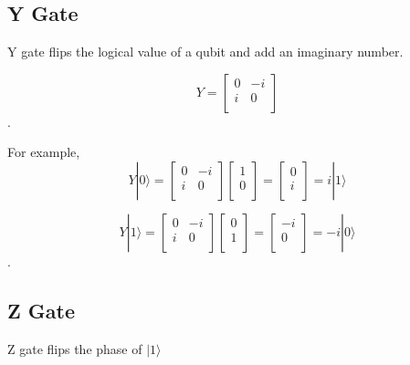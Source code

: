 \subsection{Y Gate}

Y gate flips the logical value of a qubit and add an imaginary number.

\begin{equation}
 Y = \begin{bmatrix}
0 & -i \\
i & 0 \\
\end{bmatrix}
\end{equation}.

For example,
\begin{equation}
Y|0\rangle = \begin{bmatrix}
0 & -i \\
i & 0 \\
\end{bmatrix} 
\left[
\begin{array}{c}
1 \\
0 \\
\end{array}
\right]
= \left[
\begin{array}{c}
0 \\
i \\
\end{array}
\right]
= i|1\rangle
\end{equation}

\begin{equation}
Y|1\rangle = \begin{bmatrix}
0 & -i \\
i & 0 \\
\end{bmatrix} 
\left[
\begin{array}{c}
0 \\
1  \\
\end{array}
\right]
= \left[
\begin{array}{c}
-i \\
0 \\
\end{array}
\right]
= -i|0\rangle
\end{equation}.

\subsection{Z Gate}
Z gate flips the phase of $ |1\rangle$

